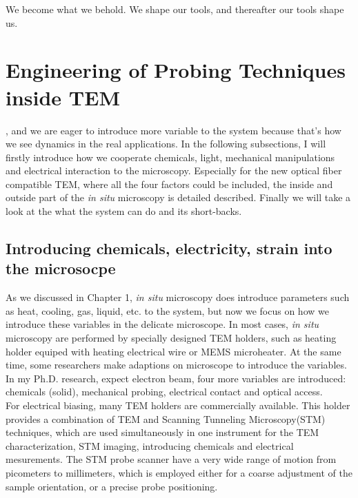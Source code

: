
\begin{savequote}[75mm] 
We become what we behold. We shape our tools, and thereafter our tools shape us.
\end{savequote}

\chapter{Engineering of Probing Techniques inside TEM}

, and we are eager to introduce more variable to the system because that's how we see dynamics in the real applications.
In the following subsections, I will firstly introduce how we cooperate chemicals, light, mechanical manipulations and electrical interaction to the microscopy. 
Especially for the new optical fiber compatible TEM, where all the four factors could be included, the inside and outside part of the \emph{in situ} microscopy is detailed described. 
Finally we will take a look at the what the system can do and its short-backs. 

\section{Introducing chemicals, electricity, strain into the microsocpe}

As we discussed in Chapter 1, \emph{in situ} microscopy does introduce parameters such as heat, cooling, gas, liquid, etc. to the system, but now we focus on how we introduce these variables in the delicate microscope. In most cases, {\em in situ} microscopy are performed by specially designed TEM holders, such as heating holder equiped with heating electrical wire or MEMS microheater. At the same time, some researchers make adaptions on microscope to introduce the variables. In my Ph.D. research, expect electron beam, four more variables are introduced: chemicals (solid), mechanical probing, electrical contact and optical access. \\

For electrical biasing, many TEM holders are commercially available. This holder provides a combination of TEM and Scanning Tunneling Microscopy(STM) techniques, which are used simultaneously in one instrument for the TEM characterization, STM imaging, introducing chemicals and electrical mesurements. The STM probe scanner have a very wide range of motion from picometers to millimeters, which is employed either for a coarse adjustment of the sample orientation, or a precise probe positioning. \\

